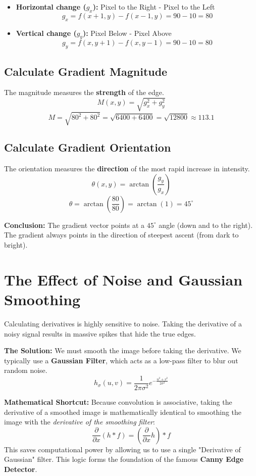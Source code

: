\documentclass{report}
\begin{document}
\begin{itemize}
    \item \textbf{Horizontal change ($g_x$):} Pixel to the Right - Pixel to the Left
          \[ g_x = f(x+1, y) - f(x-1, y) = 90 - 10 = 80 \]

    \item \textbf{Vertical change ($g_y$):} Pixel Below - Pixel Above
          \[ g_y = f(x, y+1) - f(x, y-1) = 90 - 10 = 80 \]
\end{itemize}

\subsection{Calculate Gradient Magnitude}
The magnitude measures the \textbf{strength} of the edge.
\[ M(x,y) = \sqrt{g_x^2 + g_y^2} \]
\[ M = \sqrt{80^2 + 80^2} = \sqrt{6400 + 6400} = \sqrt{12800} \approx 113.1 \]

\subsection{Calculate Gradient Orientation}
The orientation measures the \textbf{direction} of the most rapid increase in intensity.
\[ \theta(x,y) = \arctan\left(\frac{g_y}{g_x}\right) \]
\[ \theta = \arctan\left(\frac{80}{80}\right) = \arctan(1) = 45^\circ \]

\textbf{Conclusion:} The gradient vector points at a $45^\circ$ angle (down and to the right). The gradient always points in the direction of steepest ascent (from dark to bright).

\section{The Effect of Noise and Gaussian Smoothing}
Calculating derivatives is highly sensitive to noise. Taking the derivative of a noisy signal results in massive spikes that hide the true edges.

\textbf{The Solution:} We must smooth the image before taking the derivative. We typically use a \textbf{Gaussian Filter}, which acts as a low-pass filter to blur out random noise.
\[ h_\sigma(u,v) = \frac{1}{2\pi\sigma^2} e^{-\frac{u^2+v^2}{2\sigma^2}} \]

\textbf{Mathematical Shortcut:} Because convolution is associative, taking the derivative of a smoothed image is mathematically identical to smoothing the image with the \textit{derivative of the smoothing filter}:
\[ \frac{\partial}{\partial x}(h * f) = \left(\frac{\partial}{\partial x}h\right) * f \]
This saves computational power by allowing us to use a single "Derivative of Gaussian" filter. This logic forms the foundation of the famous \textbf{Canny Edge Detector}.
\end{document}
